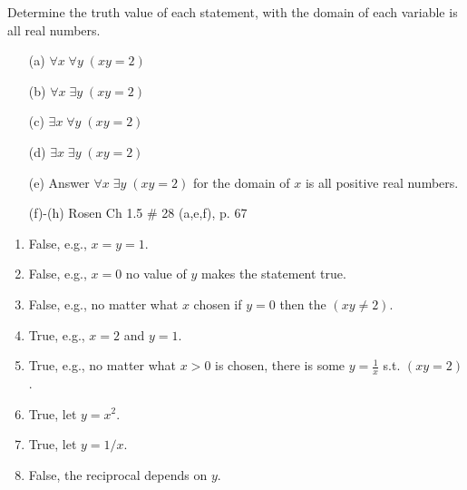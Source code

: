\documentclass[12pt,addpoints]{exam}
\begin{document}
\begin{questions}
\question[8] Determine the truth value of each statement, with the domain of each variable is all real numbers.
\begin{itemize}[itemsep=0pt,parsep=0pt,topsep=0pt,partopsep=0pt]
    \item[(a)] $\forall x\; \forall y\; (xy = 2)$
    \item[(b)] $\forall x\; \exists y\; (xy = 2)$
    \item[(c)] $\exists x\; \forall y\; (xy = 2)$
    \item[(d)] $\exists x\; \exists y\; (xy = 2)$
    \item[(e)] Answer $\forall x\; \exists y\; (xy=2)$ for the domain of $x$ is all positive real numbers.
    \item[(f)-(h)] Rosen Ch 1.5 \# 28 (a,e,f), p. 67
\end{itemize}
    \ifprintanswers
        \vspace{-10pt}
    \fi
\begin{solution}
    \begin{enumerate}[label=(\alph*),itemsep=0pt,parsep=0pt,topsep=0pt,partopsep=0pt]
        \item False, e.g., $x = y = 1$.
        \item False, e.g., $x = 0$ no value of $y$ makes the statement true.
        \item False, e.g., no matter what $x$ chosen if $y=0$ then the $(xy \neq 2)$.
        \item True, e.g., $x = 2$ and $y=1$.
        \item True, e.g., no matter what $x>0$ is chosen, there is some $y = \frac{1}{x}$ s.t. $(xy=2)$.
        \item True, let $y = x^2$.
        \item True, let $y = 1/x$.
        \item False, the reciprocal depends on $y$.
    \end{enumerate}
\end{solution}



\end{questions}
\end{document}
